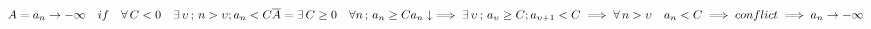 \documentclass{article}
\begin{document}
    \begin{math}
        \\
        A = a_n \to -\infty \quad if \quad \forall\, C < 0 \quad \exists\, \upsilon\,;\, n > \upsilon ; a_n < C\\
        \\
        \overline{A} = \exists\, C \geq 0 \quad \forall n\,;\, a_n \geq C\\
        \\
        a_n\downarrow \implies \exists\, \upsilon\,;\, a_\upsilon \geq C; a_{\upsilon + 1} < C\\
        \\
        \implies \forall\, n > \upsilon \quad a_n < C \implies conflict\\
        \\
        \implies a_n \to -\infty
    \end{math}
\end{document}
